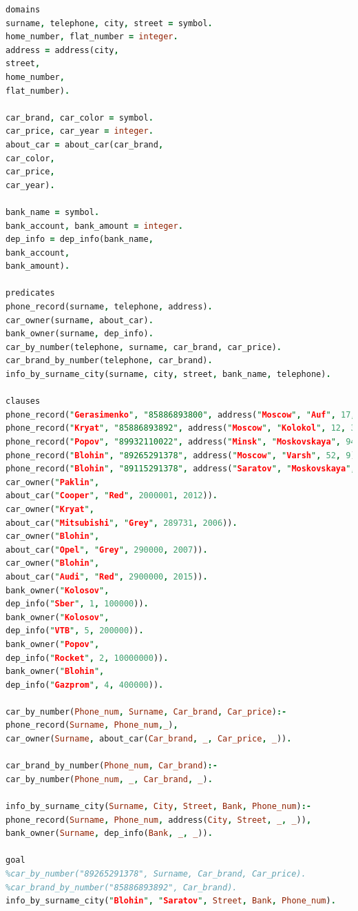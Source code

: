 \documentclass[12pt,a4paper,oneside]{report}
\begin{document}
\begin{lstlisting}[language=Prolog]
domains
surname, telephone, city, street = symbol.
home_number, flat_number = integer.
address = address(city,
street,
home_number,
flat_number).

car_brand, car_color = symbol.
car_price, car_year = integer.
about_car = about_car(car_brand,
car_color,
car_price,
car_year).

bank_name = symbol.
bank_account, bank_amount = integer.
dep_info = dep_info(bank_name,
bank_account,
bank_amount).

predicates
phone_record(surname, telephone, address).
car_owner(surname, about_car).
bank_owner(surname, dep_info).
car_by_number(telephone, surname, car_brand, car_price).
car_brand_by_number(telephone, car_brand).
info_by_surname_city(surname, city, street, bank_name, telephone).

clauses
phone_record("Gerasimenko", "85886893800", address("Moscow", "Auf", 17, 33)). 
phone_record("Kryat", "85886893892", address("Moscow", "Kolokol", 12, 33)). 
phone_record("Popov", "89932110022", address("Minsk", "Moskovskaya", 94, 11)). 
phone_record("Blohin", "89265291378", address("Moscow", "Varsh", 52, 9)).
phone_record("Blohin", "89115291378", address("Saratov", "Moskovskaya", 5, 9)).
car_owner("Paklin",
about_car("Cooper", "Red", 2000001, 2012)).
car_owner("Kryat",
about_car("Mitsubishi", "Grey", 289731, 2006)).
car_owner("Blohin",
about_car("Opel", "Grey", 290000, 2007)).
car_owner("Blohin",
about_car("Audi", "Red", 2900000, 2015)).
bank_owner("Kolosov",
dep_info("Sber", 1, 100000)).
bank_owner("Kolosov",
dep_info("VTB", 5, 200000)).
bank_owner("Popov",
dep_info("Rocket", 2, 10000000)).
bank_owner("Blohin",
dep_info("Gazprom", 4, 400000)).

car_by_number(Phone_num, Surname, Car_brand, Car_price):-
phone_record(Surname, Phone_num,_),
car_owner(Surname, about_car(Car_brand, _, Car_price, _)).

car_brand_by_number(Phone_num, Car_brand):-
car_by_number(Phone_num, _, Car_brand, _).

info_by_surname_city(Surname, City, Street, Bank, Phone_num):-
phone_record(Surname, Phone_num, address(City, Street, _, _)),
bank_owner(Surname, dep_info(Bank, _, _)).

goal
%car_by_number("89265291378", Surname, Car_brand, Car_price).
%car_brand_by_number("85886893892", Car_brand).
info_by_surname_city("Blohin", "Saratov", Street, Bank, Phone_num).
\end{lstlisting}
\end{document}
